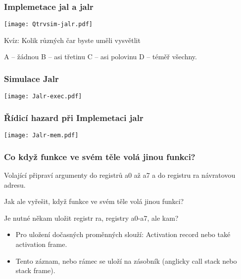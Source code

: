 \documentclass{beamer}
\begin{document}
\begin{frame}
\frametitle{Implemetace jal a jalr}

\begin{center}
\texttt{[image: Qtrvsim-jalr.pdf]}
\end{center}

Kvíz: Kolik různých čar byste uměli vysvětlit

\phantom{Kvíz: }A -- žádnou B -- asi třetinu  C -- asi polovinu D -- téměř všechny.
\end{frame}


\begin{frame}
\frametitle{Simulace Jalr}

\begin{center}
\texttt{[image: Jalr-exec.pdf]}
\end{center}

\end{frame}



\begin{frame}
\frametitle{Řídicí hazard při Implemetaci jalr}

\begin{center}
\texttt{[image: Jalr-mem.pdf]}
\end{center}

\end{frame}



\begin{frame}
\frametitle{Co když funkce ve svém těle volá jinou funkci?}

Volající připraví argumenty do registrů a0 až a7 a do registru ra návratovou adresu.

\bigskip

Jak ale vyřešit, když funkce ve svém těle volá jinou funkci?

\bigskip

Je nutné někam uložit registr ra, registry a0-a7, ale kam?


\begin{itemize}
 \item Pro uložení dočasných proměnných slouží: Activation record nebo také activation frame. 
 \item Tento záznam, nebo rámec se uloží na zásobník (anglicky call stack nebo stack frame).
\end{itemize}
\end{frame}
\end{document}
